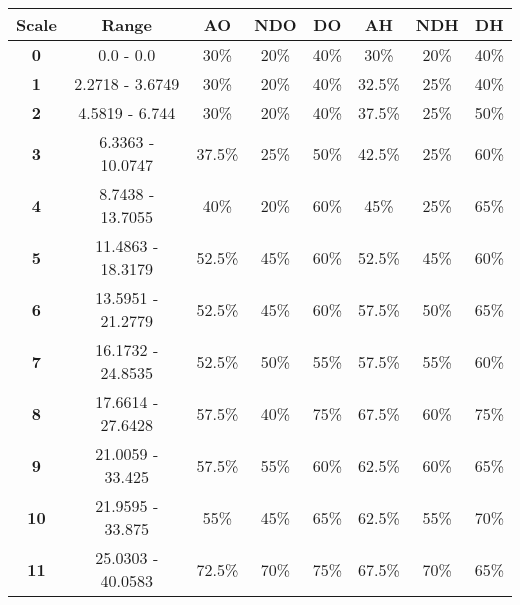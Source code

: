\begin{tabular}{ | c || c | c | c | c | c | c | c | }
\hline
{\bf Scale} & {\bf Range} & {\bf AO} & {\bf NDO} & {\bf DO} & {\bf AH} & {\bf NDH} & {\bf DH}
\\
\hline
\hline
{\bf 0} & 0.0 - 0.0 & 30\% & 20\% & 40\% & 30\% & 20\% & 40\% \\ \hline
{\bf 1} & 2.2718 - 3.6749 & 30\% & 20\% & 40\% & 32.5\% & 25\% & 40\% \\ \hline
{\bf 2} & 4.5819 - 6.744 & 30\% & 20\% & 40\% & 37.5\% & 25\% & 50\% \\ \hline
{\bf 3} & 6.3363 - 10.0747 & 37.5\% & 25\% & 50\% & 42.5\% & 25\% & 60\% \\ \hline
{\bf 4} & 8.7438 - 13.7055 & 40\% & 20\% & 60\% & 45\% & 25\% & 65\% \\ \hline
{\bf 5} & 11.4863 - 18.3179 & 52.5\% & 45\% & 60\% & 52.5\% & 45\% & 60\% \\ \hline
{\bf 6} & 13.5951 - 21.2779 & 52.5\% & 45\% & 60\% & 57.5\% & 50\% & 65\% \\ \hline
{\bf 7} & 16.1732 - 24.8535 & 52.5\% & 50\% & 55\% & 57.5\% & 55\% & 60\% \\ \hline
{\bf 8} & 17.6614 - 27.6428 & 57.5\% & 40\% & 75\% & 67.5\% & 60\% & 75\% \\ \hline
{\bf 9} & 21.0059 - 33.425 & 57.5\% & 55\% & 60\% & 62.5\% & 60\% & 65\% \\ \hline
{\bf 10} & 21.9595 - 33.875 & 55\% & 45\% & 65\% & 62.5\% & 55\% & 70\% \\ \hline
{\bf 11} & 25.0303 - 40.0583 & 72.5\% & 70\% & 75\% & 67.5\% & 70\% & 65\% \\ \hline
\end{tabular}